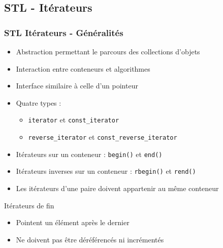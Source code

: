 \documentclass[C++.tex]{subfiles}
\begin{document}
\subsection*{STL - Itérateurs}
\begin{frame}
	\frametitle{STL Itérateurs - Généralités}
	\begin{itemize}
		\item Abstraction permettant le parcours des collections d'objets
		\item Interaction entre conteneurs et algorithmes
		\item Interface similaire à celle d'un pointeur
		\item Quatre types :
		\begin{itemize}
			\item \lstinline|iterator| et \lstinline|const_iterator|
			\item \lstinline|reverse_iterator| et \lstinline|const_reverse_iterator|


		\end{itemize}
		\item Itérateurs sur un conteneur : \lstinline|begin()| et \lstinline|end()|
		\item Itérateurs inverses sur un conteneur : \lstinline|rbegin()| et \lstinline|rend()|
		\item Les itérateurs d'une paire doivent appartenir au même conteneur
	\end{itemize}

	\begin{alertblock}{Itérateurs de fin}
		\begin{itemize}
			\item Pointent un élément après le dernier
			\item Ne doivent pas être déréférencés ni incrémentés
		\end{itemize}
	\end{alertblock}


\end{frame}
\end{document}
